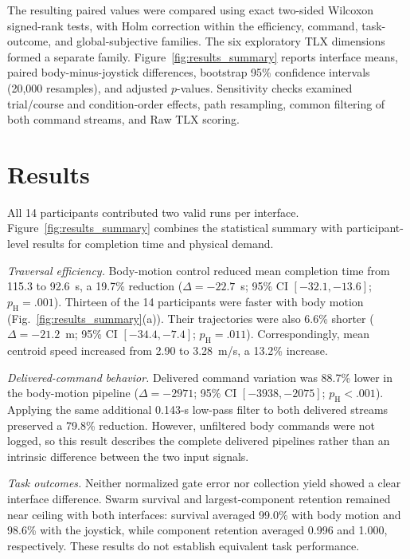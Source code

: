 \documentclass[conference, a4paper]{IEEEtran}
\begin{document}
The resulting paired values were compared using exact two-sided Wilcoxon
signed-rank tests, with Holm correction within the efficiency, command,
task-outcome, and global-subjective families. The six exploratory TLX
dimensions formed a separate family. Figure~\ref{fig:results_summary} reports
interface means, paired body-minus-joystick differences, bootstrap 95\%
confidence intervals (20,000 resamples), and adjusted $p$-values. Sensitivity
checks examined trial/course and condition-order effects, path resampling,
common filtering of both command streams, and Raw TLX scoring.

\section{Results}

All 14 participants contributed two valid runs per interface.
Figure~\ref{fig:results_summary} combines the statistical summary with
participant-level results for completion time and physical demand.

\emph{Traversal efficiency.}
Body-motion control reduced mean completion time from 115.3 to 92.6~s, a
19.7\% reduction ($\Delta=-22.7$~s; 95\% CI $[-32.1,-13.6]$;
$p_{\mathrm H}=.001$). Thirteen of the 14 participants were faster with body
motion (Fig.~\ref{fig:results_summary}(a)). Their trajectories were also 6.6\%
shorter ($\Delta=-21.2$~m; 95\% CI $[-34.4,-7.4]$;
$p_{\mathrm H}=.011$). Correspondingly, mean centroid speed increased from
2.90 to 3.28~m/s, a 13.2\% increase.

\emph{Delivered-command behavior.}
Delivered command variation was 88.7\% lower in the body-motion pipeline
($\Delta=-2971$; 95\% CI $[-3938,-2075]$;
$p_{\mathrm H}<.001$). Applying the same additional 0.143-s low-pass filter
to both delivered streams preserved a 79.8\% reduction. However, unfiltered
body commands were not logged, so this result describes the complete delivered
pipelines rather than an intrinsic difference between the two input signals.

\emph{Task outcomes.}
Neither normalized gate error nor collection yield showed a clear interface
difference. Swarm survival and largest-component retention remained near
ceiling with both interfaces: survival averaged 99.0\% with body motion and
98.6\% with the joystick, while component retention averaged 0.996 and 1.000,
respectively. These results do not establish equivalent task performance.
\end{document}
